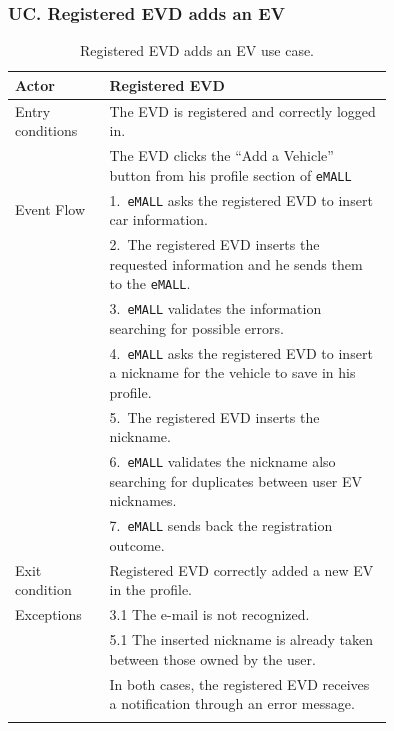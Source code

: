 \subsubsection*{UC\cuc . Registered EVD adds an EV}
\begin{center}
    \begin{longtable}{lp{0.75\linewidth}}
        \hline
        Actor            & Registered EVD                                                                                 \\
        \hline
        Entry conditions & The EVD is registered and correctly logged in.                                                 \\
        & The EVD clicks the ``Add a Vehicle'' button from his profile section of \verb|eMALL|                  \\
        \hline
        Event Flow       & 1.\ \verb|eMALL| asks the registered EVD to insert car information.                                   \\
        & 2.\ The registered EVD inserts the requested information and he sends them to the \verb|eMALL|.       \\
        & 3.\ \verb|eMALL| validates the information searching for possible errors.                             \\
        & 4.\ \verb|eMALL| asks the registered EVD to insert a nickname for the vehicle to save in his profile. \\
        & 5.\ The registered EVD inserts the nickname.                                                   \\
        & 6.\ \verb|eMALL| validates the nickname also searching for duplicates between user EV nicknames.      \\
        & 7.\ \verb|eMALL| sends back the registration outcome.                                                 \\
        \hline
        Exit condition   & Registered EVD correctly added a new EV in the profile.                                        \\
        \hline
        Exceptions       & 3.1 The e-mail is not recognized.                                                              \\
        & 5.1 The inserted nickname is already taken between those owned by the user.                    \\
        & In both cases, the registered EVD receives a notification through an error message.            \\
        \hline
        \caption{Registered EVD adds an EV use case.}
        \label{tab: EVD_adds_a_vehicle_use_case}
    \end{longtable}


\end{center}
